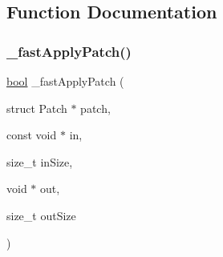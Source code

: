 \subsection{Function Documentation}
\mbox{\label{patch-fast_8c_ab67102e77abbaa460f97daeef660dc16}} 
\subsubsection{\texorpdfstring{\+\_\+fast\+Apply\+Patch()}{\_fastApplyPatch()}}
{\footnotesize\ttfamily \mbox{\hyperlink{libretro_8h_a4a26dcae73fb7e1528214a068aca317e}{bool}} \+\_\+fast\+Apply\+Patch (\begin{DoxyParamCaption}\item[{struct Patch $\ast$}]{patch,  }\item[{const void $\ast$}]{in,  }\item[{size\+\_\+t}]{in\+Size,  }\item[{void $\ast$}]{out,  }\item[{size\+\_\+t}]{out\+Size }\end{DoxyParamCaption})}

